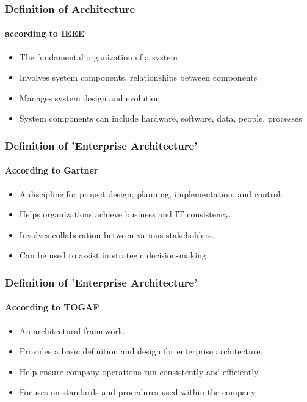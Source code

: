 \documentclass[aspectratio=169, table]{beamer}
\begin{document}
    \begin{frame}
        \frametitle{Definition of Architecture}
        \framesubtitle{according to IEEE}
        \begin{itemize}
            \item The fundamental organization of a system
            \item Involves system components, relationships between components
            \item Manages system design and evolution
            \item System components can include hardware, software, data, people, processes
        \end{itemize}
    \end{frame}



    \begin{frame}
        \frametitle{Definition of 'Enterprise Architecture'}
        \framesubtitle{According to Gartner}
        \begin{itemize}
            \item A discipline for project design, planning, implementation, and control.
            \item Helps organizations achieve business and IT consistency.
            \item Involves collaboration between various stakeholders.
            \item Can be used to assist in strategic decision-making.
        \end{itemize}
    \end{frame}

    \begin{frame}
        \frametitle{Definition of 'Enterprise Architecture'}
        \framesubtitle{According to TOGAF}
        \begin{itemize}
            \item An architectural framework.
            \item Provides a basic definition and design for enterprise architecture.
            \item Help ensure company operations run consistently and efficiently.
            \item Focuses on standards and procedures used within the company.
        \end{itemize}
    \end{frame}
\end{document}
